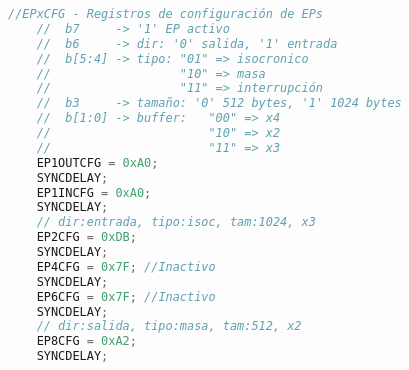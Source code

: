 	\begin{lstlisting}[language=C,backgroundcolor=\color{gray!30}]
	//EPxCFG - Registros de configuración de EPs
	//	b7 	   -> '1' EP activo
	//	b6 	   -> dir: '0' salida, '1' entrada
	//	b[5:4] -> tipo: "01" => isocronico
	//					"10" => masa
	//					"11" => interrupción
	//	b3 	   -> tamaño: '0' 512 bytes, '1' 1024 bytes
	//	b[1:0] -> buffer: 	"00" => x4
	//						"10" => x2
	//						"11" => x3
	EP1OUTCFG = 0xA0;
	SYNCDELAY;
	EP1INCFG = 0xA0;
	SYNCDELAY;
	// dir:entrada, tipo:isoc, tam:1024, x3
	EP2CFG = 0xDB;
	SYNCDELAY;
	EP4CFG = 0x7F; //Inactivo
	SYNCDELAY;
	EP6CFG = 0x7F; //Inactivo
	SYNCDELAY;
	// dir:salida, tipo:masa, tam:512, x2
	EP8CFG = 0xA2; 
	SYNCDELAY;
	\end{lstlisting}
	

%	
%	

